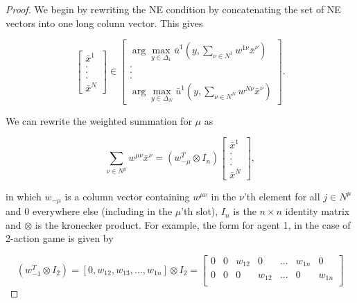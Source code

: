 \documentclass{article}
\theoremstyle{definition}
\begin{document}
	\begin{proof}
		We begin by rewriting the NE condition by concatenating the set of NE vectors into one long colunn vector. This gives

		\begin{equation}
			\begin{bmatrix}
				\bar{x}^1 \\ . \\ . \\ . \\ \bar{x}^N
			\end{bmatrix} \in
			\begin{bmatrix}
			\arg\max_{y \in \Delta_1} \bar{u}^1(y, \sum_{\nu \in N^1} w^{1 \nu} \bar{x}^\nu) \\ . \\ . \\ . \\ \arg\max_{y \in \Delta_N} \bar{u}^1(y, \sum_{\nu \in N^N} w^{N \nu} \bar{x}^\nu)
			\end{bmatrix}	.
		\end{equation}

		We can rewrite the weighted summation for $\mu$ as

		\begin{equation}
			\sum_{\nu \in N^\mu} w^{\mu \nu} \bar{x}^\nu = (w_{-\mu}^T \otimes I_n) \begin{bmatrix}
				\bar{x}^1 \\ . \\ . \\ . \\ \bar{x}^N
			\end{bmatrix},
		\end{equation}
	
		in which $w_{-\mu}$ is a column vector containing $w^{\mu \nu}$ in the $\nu$'th element for all $j \in N^\mu$ and 0 everywhere else (including in the $\mu$'th slot), $I_n$ is the $n \times n$ identity matrix and $\otimes$ is the kronecker product. For example, the form for agent 1, in the case of 2-action game is given by

		\begin{equation}
			(w_{-1}^T \otimes I_2) = [0, w_{12}, w_{13}, ..., w_{1n}] \otimes I_2 = 
			\begin{bmatrix}
				0 & 0 & w_{12} & 0 & ... & w_{1n} & 0 \\
				0 & 0 & 0 & w_{12} & ... & 0 & w_{1n} \\
			\end{bmatrix}
		\end{equation}
		

\end{proof}
\end{document}
